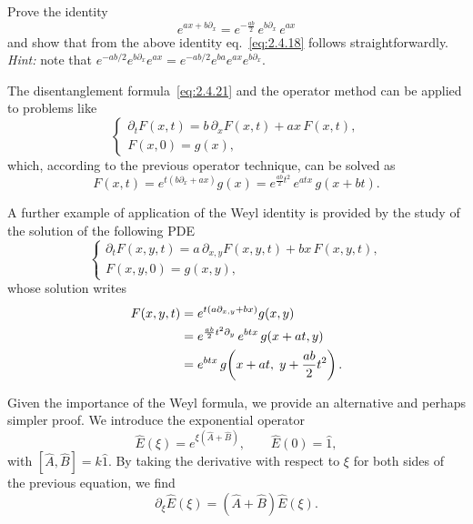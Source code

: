 \begin{exercise}
Prove the identity
\begin{equation}
e^{a x+b\partial_{x}}=e^{-\frac{a b}{2}}\,e^{b\partial_{x}}\,e^{a x}
\label{eq:2.4.23}
\end{equation}
and show that from the above identity eq.~\eqref{eq:2.4.18} follows straightforwardly.\\
\textit{Hint:} note that $e^{-ab/2}e^{b\partial_{x}}e^{ax}
=e^{-ab/2}e^{ba}e^{ax}e^{b\partial_{x}}$.
\end{exercise}

The disentanglement formula~\eqref{eq:2.4.21} and the operator method can be applied to problems like
\begin{equation}
\begin{cases}
\partial_{t}F(x,t)=b\,\partial_{x}F(x,t)+a x\,F(x,t),\\[1mm]
F(x,0)=g(x),
\end{cases}
\label{eq:2.4.24}
\end{equation}
which, according to the previous operator technique, can be solved as
\begin{equation}
F(x,t)=e^{t(b\partial_{x}+a x)}g(x)
=e^{\frac{a b}{2}t^{2}}\,e^{a t x}\,g(x+b t).
\label{eq:2.4.25}
\end{equation}

A further example of application of the Weyl identity is provided by the study of the solution of the following PDE
\begin{equation}
\begin{cases}
\partial_{t}F(x,y,t)=a\,\partial_{x,y}F(x,y,t)+b x\,F(x,y,t),\\[1mm]
F(x,y,0)=g(x,y),
\end{cases}
\label{eq:2.4.26}
\end{equation}
whose solution writes
\begin{align}
F(x,y,t)&=e^{t(a\partial_{x,y}+b x)}g(x,y)\notag\\
&=e^{\frac{a b}{2}t^{2}\partial_{y}}\,e^{b t x}\,g(x+a t,y)\notag\\
&=e^{b t x}\,g\!\left(x+a t,\;y+\frac{a b}{2}t^{2}\right).
\label{eq:2.4.27}
\end{align}

Given the importance of the Weyl formula, we provide an alternative and perhaps simpler proof. We introduce the exponential operator
\begin{equation}
\hat{E}(\xi)=e^{\xi(\hat{A}+\hat{B})},\qquad \hat{E}(0)=\hat{1},
\label{eq:2.4.28}
\end{equation}
with $[\hat{A},\hat{B}]=k\hat{1}$. By taking the derivative with respect to $\xi$ for both sides of the previous equation, we find
\begin{equation}
\partial_{\xi}\hat{E}(\xi)=(\hat{A}+\hat{B})\hat{E}(\xi).
\label{eq:2.4.29}
\end{equation}

